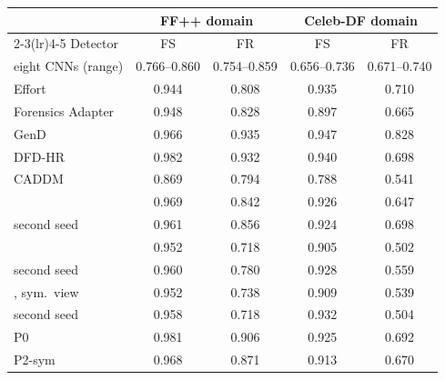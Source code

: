 \begin{tabular}{@{}l cc cc@{}}
\toprule
 & \multicolumn{2}{c}{FF++ domain} & \multicolumn{2}{c}{Celeb-DF domain} \\
\cmidrule(lr){2-3}\cmidrule(lr){4-5}
Detector & FS & FR & FS & FR \\
\midrule
eight CNNs (range) & 0.766--0.860 & 0.754--0.859 & 0.656--0.736 & 0.671--0.740 \\
Effort~\cite{effort} & 0.944 & 0.808 & 0.935 & 0.710 \\
Forensics Adapter~\cite{forensicsadapter} & 0.948 & 0.828 & 0.897 & 0.665 \\
GenD~\cite{gend2026} & 0.966 & 0.935 & 0.947 & 0.828 \\
DFD-HR~\cite{dfdhr2026} & 0.982 & 0.932 & 0.940 & 0.698 \\
CADDM~\cite{caddm} & 0.869 & 0.794 & 0.788 & 0.541 \\
\midrule
\oursB{} & 0.969 & 0.842 & 0.926 & 0.647 \\
\quad second seed & 0.961 & 0.856 & 0.924 & 0.698 \\
\oursF{} & 0.952 & 0.718 & 0.905 & 0.502 \\
\quad second seed & 0.960 & 0.780 & 0.928 & 0.559 \\
\oursF{}, sym.\ view & 0.952 & 0.738 & 0.909 & 0.539 \\
\quad second seed & 0.958 & 0.718 & 0.932 & 0.504 \\
P0 & 0.981 & 0.906 & 0.925 & 0.692 \\
P2-sym & 0.968 & 0.871 & 0.913 & 0.670 \\
\bottomrule
\end{tabular}
